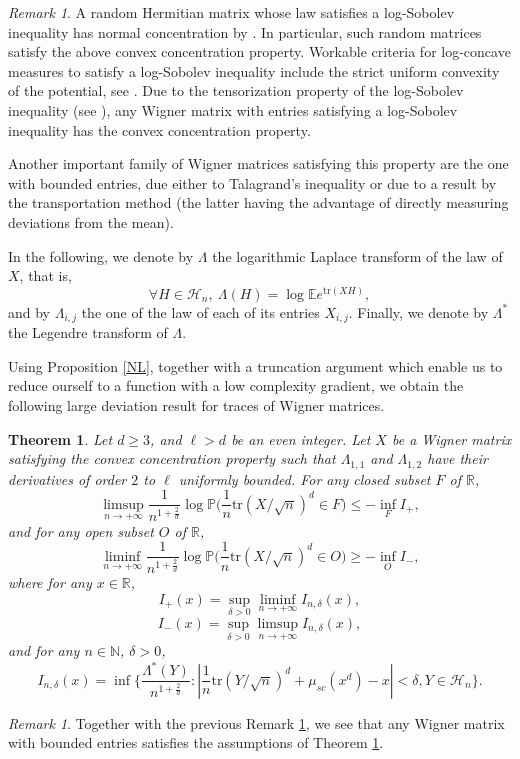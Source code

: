 \documentclass[aop,preprint]{imsart}
\newcommand\NN{\mathbb{N}}
\newcommand\RR{\mathbb{R}}
\newcommand\PP{\mathbb{P}}
\newcommand\EE{\mathbb{E}}
\newcommand\tr{\mathrm{tr}}
\numberwithin{equation}{section}
\theoremstyle{definition}
\theoremstyle{plain}
\newtheorem{The}[Def]{Theorem}
\theoremstyle{remark}
\newtheorem{Rem}[Def]{Remark}
\begin{document}
\begin{Rem}\label{remconc}
A random Hermitian matrix whose law satisfies a log-Sobolev inequality has normal concentration by \cite[Theorem 5.3]{Ledouxmono}. In particular, such random matrices satisfy the above convex concentration property. Workable criteria for log-concave measures to satisfy a log-Sobolev inequality include the strict uniform convexity of the potential, see \cite[Theorem 5.2]{Ledouxmono}. Due to the tensorization property of the log-Sobolev inequality  (see \cite[Corollary 5.7]{Ledouxmono}), any Wigner matrix with entries satisfying a log-Sobolev inequality has the convex concentration property.

 Another important family of Wigner matrices satisfying this property are the one with bounded entries, due either to Talagrand's inequality \cite[Corollary 4.10]{Ledouxmono} or due to a result by the transportation method \cite[Theorem 8.6]{BLM} (the latter having the advantage of directly measuring deviations from the mean).


\end{Rem}
In the following, we denote by $\Lambda$ the logarithmic Laplace transform of the law of $X$, that is,
$$\forall H\in\mathcal{H}_n, \ \Lambda(H) = \log \EE e^{\tr (XH)},$$
and by $\Lambda_{i,j}$ the one of the law of each of its entries $X_{i,j}$. Finally, we denote by $\Lambda^*$ the Legendre transform of $\Lambda$.


Using Proposition \ref{NL}, together with a truncation argument which enable us to reduce ourself to a function with a low complexity gradient, we obtain the following large deviation result for traces of Wigner matrices.



\begin{The}\label{LDPtrb}Let $d \geq 3$, and $\ell>d$ be an even integer.
Let $X$ be a Wigner matrix satisfying the convex concentration property such that $\Lambda_{1,1}$ and $\Lambda_{1,2}$ have their derivatives of order $2$ to $\ell$ uniformly bounded.  For any closed subset $F$ of $\RR$,
$$\limsup_{n\to +\infty} \frac{1}{n^{1+\frac{2}{d}}} \log \PP \Big( \frac{1}{n} \tr(X/\sqrt{n})^d \in F \Big) \leq - \inf_F I_+,$$
and for any open subset $O$ of $\RR$,
$$\liminf_{n\to +\infty} \frac{1}{n^{1+\frac{2}{d}}} \log \PP \Big( \frac{1}{n} \tr(X/\sqrt{n})^d \in O \Big) \geq - \inf_O I_-,$$
where for any $x\in\RR$,
$$ I_+(x) =  \sup_{\delta>0}\liminf_{n\to +\infty} I_{n,\delta}(x),$$
$$ I_-(x) =\sup_{\delta>0}\limsup_{n\to +\infty} I_{n,\delta}(x),$$
and for any $n\in \NN$, $\delta>0$,
$$ I_{n,\delta}(x) = \inf \Big\{ \frac{\Lambda^*(Y)}{n^{1+\frac{2}{d}}} : |\frac{1}{n} \tr (Y/\sqrt{n})^d + \mu_{sc}(x^d) - x| <\delta, Y \in \mathcal{H}_n \Big\}.$$ 
\end{The}
\begin{Rem}
Together with the previous Remark \ref{remconc}, we see that any Wigner matrix with bounded entries satisfies the assumptions of Theorem \ref{LDPtrb}.

\end{Rem}
\end{document}

